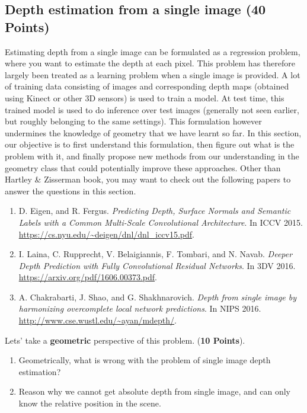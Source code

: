 \documentclass[11pt]{article}
\begin{document}
\subsection{Depth estimation from a single image (40 Points)}
Estimating depth from a single image can be formulated as a regression problem, where you want to estimate the depth at each pixel. This problem has therefore largely been treated as a learning problem when a single image is provided. A lot of training data consisting of images and corresponding depth maps (obtained using Kinect or other 3D sensors) is used to train a model. At test time, this trained model is used to do inference over test images (generally not seen earlier, but roughly belonging to the same settings). This formulation however undermines the knowledge of geometry that we have learnt so far. In this section, our objective is to first understand this formulation, then figure out what is the problem with it, and finally propose new methods from our understanding in the geometry class that could potentially improve these approaches. Other than Hartley \& Zisserman book, you may want to check out the following papers to answer the questions in this section.
\begin{enumerate}
\item D. Eigen, and R. Fergus. \textit{Predicting Depth, Surface Normals and Semantic Labels with a Common Multi-Scale Convolutional Architecture}. In ICCV 2015. \url{https://cs.nyu.edu/~deigen/dnl/dnl_iccv15.pdf}.
\item I. Laina, C. Rupprecht, V. Belaigiannis, F. Tombari, and N. Navab. \textit{Deeper Depth Prediction with Fully Convolutional Residual Networks}. In 3DV 2016. \url{https://arxiv.org/pdf/1606.00373.pdf}.
\item A. Chakrabarti, J. Shao, and G. Shakhnarovich. \textit{Depth from single image by harmonizing overcomplete local network predictions}. In NIPS 2016. \url{http://www.cse.wustl.edu/~ayan/mdepth/}.
\end{enumerate}

Lets' take a \textbf{geometric} perspective of this problem. (\textbf{10 Points}).
\begin{enumerate}
\item Geometrically, what is wrong with the problem of single image depth estimation?
\item Reason  why we cannot get absolute depth from single image, and can only know the relative position in the scene.
\end{enumerate}
\end{document}
